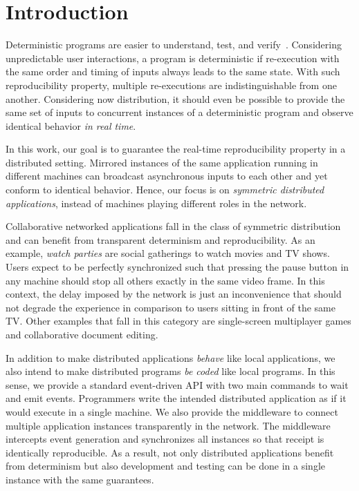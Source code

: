 \documentclass[sigplan,screen]{acmart}
\begin{document}
\section{Introduction}

Deterministic programs are easier to understand, test, and verify~\cite{det}.
Considering unpredictable user interactions, a program is deterministic if
re-execution with the same order and timing of inputs always leads to the same
state.
With such reproducibility property, multiple re-executions are
indistinguishable from one another.
Considering now distribution, it should even be possible to provide the same
set of inputs to concurrent instances of a deterministic program and observe
identical behavior \emph{in real time}.

In this work, our goal is to guarantee the real-time reproducibility property
in a distributed setting.
Mirrored instances of the same application running in different machines can
broadcast asynchronous inputs to each other and yet conform to
identical behavior.
Hence, our focus is on \emph{symmetric distributed applications}, instead of
machines playing different roles in the network.

Collaborative networked applications fall in the class of symmetric
distribution and can benefit from transparent determinism and reproducibility.
As an example, \emph{watch parties} are social gatherings to watch movies and
TV shows.
Users expect to be perfectly synchronized such that pressing the pause button
in any machine should stop all others exactly in the same video frame.
In this context, the delay imposed by the network is just an inconvenience that
should not degrade the experience in comparison to users sitting in front of
the same TV.
Other examples that fall in this category are single-screen multiplayer games
and collaborative document editing.

In addition to make distributed applications \emph{behave} like local
applications, we also intend to make distributed programs \emph{be coded} like
local programs.
In this sense, we provide a standard event-driven API with two main commands
to wait and emit events.
Programmers write the intended distributed application as if it would execute
in a single machine.
We also provide the middleware to connect multiple application instances
transparently in the network.
The middleware intercepts event generation and synchronizes all instances so
that receipt is identically reproducible.
As a result, not only distributed applications benefit from determinism but
also development and testing can be done in a single instance with the same
guarantees.
\end{document}

